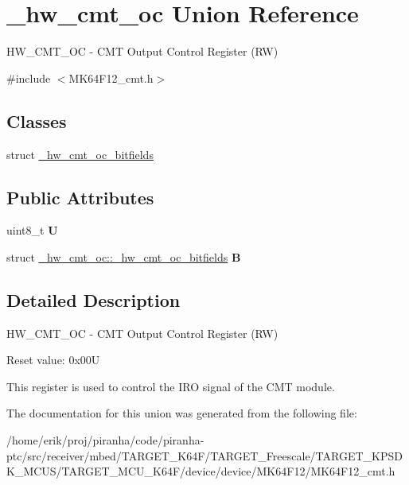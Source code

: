 \hypertarget{union__hw__cmt__oc}{}\section{\+\_\+hw\+\_\+cmt\+\_\+oc Union Reference}
\label{union__hw__cmt__oc}


H\+W\+\_\+\+C\+M\+T\+\_\+\+OC -\/ C\+MT Output Control Register (RW)  




{\ttfamily \#include $<$M\+K64\+F12\+\_\+cmt.\+h$>$}

\subsection*{Classes}
\begin{DoxyCompactItemize}
\item 
struct \hyperlink{struct__hw__cmt__oc_1_1__hw__cmt__oc__bitfields}{\+\_\+hw\+\_\+cmt\+\_\+oc\+\_\+bitfields}
\end{DoxyCompactItemize}
\subsection*{Public Attributes}
\begin{DoxyCompactItemize}
\item 
uint8\+\_\+t {\bfseries U}\hypertarget{union__hw__cmt__oc_a3bcce536f1143252e4002ed7a36c0130}{}\label{union__hw__cmt__oc_a3bcce536f1143252e4002ed7a36c0130}

\item 
struct \hyperlink{struct__hw__cmt__oc_1_1__hw__cmt__oc__bitfields}{\+\_\+hw\+\_\+cmt\+\_\+oc\+::\+\_\+hw\+\_\+cmt\+\_\+oc\+\_\+bitfields} {\bfseries B}\hypertarget{union__hw__cmt__oc_a478b7cbca44cdc6370d33c9415b2bb05}{}\label{union__hw__cmt__oc_a478b7cbca44cdc6370d33c9415b2bb05}

\end{DoxyCompactItemize}


\subsection{Detailed Description}
H\+W\+\_\+\+C\+M\+T\+\_\+\+OC -\/ C\+MT Output Control Register (RW) 

Reset value\+: 0x00U

This register is used to control the I\+RO signal of the C\+MT module. 

The documentation for this union was generated from the following file\+:\begin{DoxyCompactItemize}
\item 
/home/erik/proj/piranha/code/piranha-\/ptc/src/receiver/mbed/\+T\+A\+R\+G\+E\+T\+\_\+\+K64\+F/\+T\+A\+R\+G\+E\+T\+\_\+\+Freescale/\+T\+A\+R\+G\+E\+T\+\_\+\+K\+P\+S\+D\+K\+\_\+\+M\+C\+U\+S/\+T\+A\+R\+G\+E\+T\+\_\+\+M\+C\+U\+\_\+\+K64\+F/device/device/\+M\+K64\+F12/M\+K64\+F12\+\_\+cmt.\+h\end{DoxyCompactItemize}
